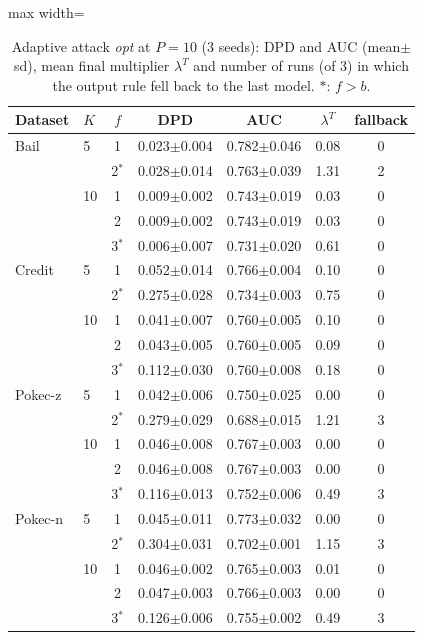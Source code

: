 \begin{table}[tbp]
\centering
\footnotesize
\caption{Adaptive attack \emph{opt} at $P=10$ (3 seeds): DPD and AUC (mean$\pm$sd), mean final multiplier $\lambda^T$ and number of runs (of 3) in which the output rule fell back to the last model. $\ast$: $f>b$.}
\label{tab:s_e7}
\begin{adjustbox}{max width=\textwidth}
\begin{tabular}{llccccc}
\toprule
Dataset & $K$ & $f$ & DPD & AUC & $\lambda^T$ & fallback \\
\midrule
Bail & 5 & 1 & 0.023$\pm$0.004 & 0.782$\pm$0.046 & 0.08 & 0 \\
 &  & 2$^\ast$ & 0.028$\pm$0.014 & 0.763$\pm$0.039 & 1.31 & 2 \\
 & 10 & 1 & 0.009$\pm$0.002 & 0.743$\pm$0.019 & 0.03 & 0 \\
 &  & 2 & 0.009$\pm$0.002 & 0.743$\pm$0.019 & 0.03 & 0 \\
 &  & 3$^\ast$ & 0.006$\pm$0.007 & 0.731$\pm$0.020 & 0.61 & 0 \\
Credit & 5 & 1 & 0.052$\pm$0.014 & 0.766$\pm$0.004 & 0.10 & 0 \\
 &  & 2$^\ast$ & 0.275$\pm$0.028 & 0.734$\pm$0.003 & 0.75 & 0 \\
 & 10 & 1 & 0.041$\pm$0.007 & 0.760$\pm$0.005 & 0.10 & 0 \\
 &  & 2 & 0.043$\pm$0.005 & 0.760$\pm$0.005 & 0.09 & 0 \\
 &  & 3$^\ast$ & 0.112$\pm$0.030 & 0.760$\pm$0.008 & 0.18 & 0 \\
Pokec-z & 5 & 1 & 0.042$\pm$0.006 & 0.750$\pm$0.025 & 0.00 & 0 \\
 &  & 2$^\ast$ & 0.279$\pm$0.029 & 0.688$\pm$0.015 & 1.21 & 3 \\
 & 10 & 1 & 0.046$\pm$0.008 & 0.767$\pm$0.003 & 0.00 & 0 \\
 &  & 2 & 0.046$\pm$0.008 & 0.767$\pm$0.003 & 0.00 & 0 \\
 &  & 3$^\ast$ & 0.116$\pm$0.013 & 0.752$\pm$0.006 & 0.49 & 3 \\
Pokec-n & 5 & 1 & 0.045$\pm$0.011 & 0.773$\pm$0.032 & 0.00 & 0 \\
 &  & 2$^\ast$ & 0.304$\pm$0.031 & 0.702$\pm$0.001 & 1.15 & 3 \\
 & 10 & 1 & 0.046$\pm$0.002 & 0.765$\pm$0.003 & 0.01 & 0 \\
 &  & 2 & 0.047$\pm$0.003 & 0.766$\pm$0.003 & 0.00 & 0 \\
 &  & 3$^\ast$ & 0.126$\pm$0.006 & 0.755$\pm$0.002 & 0.49 & 3 \\
\bottomrule
\end{tabular}
\end{adjustbox}
\end{table}
